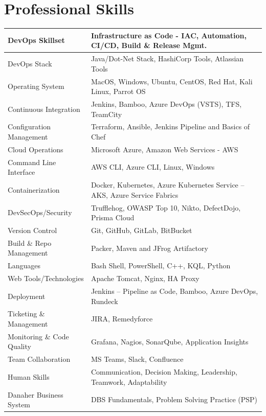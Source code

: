\documentclass[11pt, a4paper]{article}
\begin{document}
\section*{Professional Skills}
\vspace{-1.5mm}
\noindent\begin{tabular}{|>{\columncolor[gray]{0.9}}p{1.8in}|p{4.7in}|}
\hline
DevOps Skillset & Infrastructure as Code - IAC, Automation, CI/CD, Build \& Release Mgmt. \\
\hline
DevOps Stack & Java/Dot-Net Stack, HashiCorp Tools, Atlassian Tools \\
\hline
Operating System & MacOS, Windows, Ubuntu, CentOS, Red Hat, Kali Linux, Parrot OS \\
\hline
Continuous Integration & Jenkins, Bamboo, Azure DevOps (VSTS), TFS, TeamCity \\
\hline
Configuration Management 	& Terraform, Ansible, Jenkins Pipeline and Basics of Chef \\
\hline
Cloud Operations 	& Microsoft Azure, Amazon Web Services - AWS \\
\hline
Command Line Interface & AWS CLI, Azure CLI, Linux, Windows \\
\hline
Containerization  & Docker, Kubernetes, Azure Kubernetes Service – AKS, Azure Service Fabrics \\
\hline
DevSecOps/Security & Trufflehog, OWASP Top 10, Nikto, DefectDojo, Prisma Cloud \\
\hline
Version Control & Git, GitHub, GitLab, BitBucket \\
\hline
Build \& Repo Management  & Packer, Maven and JFrog Artifactory \\
\hline
Languages	 & Bash Shell, PowerShell, C++, KQL, Python \\
\hline
Web Tools/Technologies  & Apache Tomcat, Nginx, HA Proxy \\
\hline
Deployment & Jenkins – Pipeline as Code, Bamboo, Azure DevOps, Rundeck \\
\hline
Ticketing \& Management  & JIRA, Remedyforce \\
\hline
Monitoring \& Code Quality	 & Grafana, Nagios, SonarQube, Application Insights \\
\hline
Team Collaboration & MS Teams, Slack, Confluence \\
\hline
Human Skills & Communication, Decision Making, Leadership, Teamwork, Adaptability \\
\hline
Danaher Business System &	DBS Fundamentals, Problem Solving Practice (PSP)\\
\hline
\end{tabular}
\end{document}
